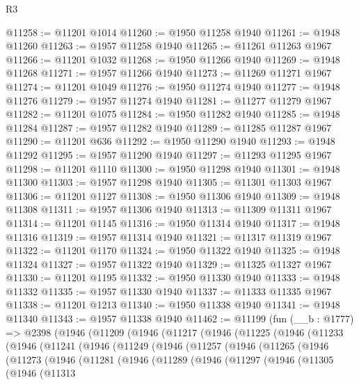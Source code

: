 \begin{lexlean}{R3}
\begin{coremodule}
@11258 := @11201 @1014
@11260 := @1950 @11258 @1940
@11261 := @1948 @11260
@11263 := @1957 @11258 @1940
@11265 := @11261 @11263 @1967
@11266 := @11201 @1032
@11268 := @1950 @11266 @1940
@11269 := @1948 @11268
@11271 := @1957 @11266 @1940
@11273 := @11269 @11271 @1967
@11274 := @11201 @1049
@11276 := @1950 @11274 @1940
@11277 := @1948 @11276
@11279 := @1957 @11274 @1940
@11281 := @11277 @11279 @1967
@11282 := @11201 @1075
@11284 := @1950 @11282 @1940
@11285 := @1948 @11284
@11287 := @1957 @11282 @1940
@11289 := @11285 @11287 @1967
@11290 := @11201 @636
@11292 := @1950 @11290 @1940
@11293 := @1948 @11292
@11295 := @1957 @11290 @1940
@11297 := @11293 @11295 @1967
@11298 := @11201 @1110
@11300 := @1950 @11298 @1940
@11301 := @1948 @11300
@11303 := @1957 @11298 @1940
@11305 := @11301 @11303 @1967
@11306 := @11201 @1127
@11308 := @1950 @11306 @1940
@11309 := @1948 @11308
@11311 := @1957 @11306 @1940
@11313 := @11309 @11311 @1967
@11314 := @11201 @1145
@11316 := @1950 @11314 @1940
@11317 := @1948 @11316
@11319 := @1957 @11314 @1940
@11321 := @11317 @11319 @1967
@11322 := @11201 @1170
@11324 := @1950 @11322 @1940
@11325 := @1948 @11324
@11327 := @1957 @11322 @1940
@11329 := @11325 @11327 @1967
@11330 := @11201 @1195
@11332 := @1950 @11330 @1940
@11333 := @1948 @11332
@11335 := @1957 @11330 @1940
@11337 := @11333 @11335 @1967
@11338 := @11201 @1213
@11340 := @1950 @11338 @1940
@11341 := @1948 @11340
@11343 := @1957 @11338 @1940
@11462 := @11199
    (fun (__b : @1777) =>
    @2398
      (@1946
        (@11209
          (@1946
            (@11217
              (@1946
                (@11225
                  (@1946
                    (@11233
                      (@1946
                        (@11241
                          (@1946
                            (@11249
                              (@1946
                                (@11257
                                  (@1946
                                    (@11265
                                      (@1946
                                        (@11273
                                          (@1946
                                            (@11281
                                              (@1946
                                                (@11289
                                                  (@1946
                                                    (@11297
                                                      (@1946
                                                        (@11305
                                                          (@1946
                                                            (@11313

\end{coremodule}
\end{lexlean}
